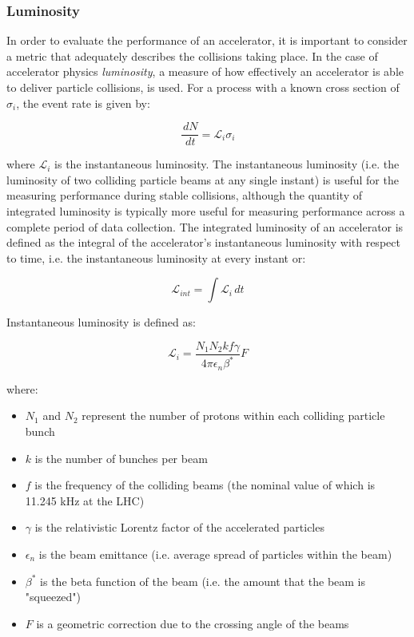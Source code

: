 \documentclass[12pt,a4paper,epsf,portrait,times,epsfig]{article}
\begin{document}

		\subsubsection{Luminosity}

		In order to evaluate the performance of an accelerator, it is important to consider a metric that adequately describes the collisions taking place. In the case of accelerator physics \textit{luminosity}, a measure of how effectively an accelerator is able to deliver particle collisions, is used. For a process with a known cross section of $\sigma_{i}$, the event rate is given by:
		
		\begin{equation}
			\frac{\,dN}{\,dt} = \mathcal{L}_{i}\sigma_{i}
		\end{equation}

		where $\mathcal{L}_{i}$ is the instantaneous luminosity. The instantaneous luminosity (i.e. the luminosity of two colliding particle beams at any single instant) is useful for the measuring performance during stable collisions, although the quantity of integrated luminosity is typically more useful for measuring performance across a complete period of data collection. The integrated luminosity of an accelerator is defined as the integral of the accelerator's instantaneous luminosity with respect to time, i.e. the instantaneous luminosity at every instant or:
		
		\begin{equation}
			\mathcal{L}_{int} = \int \mathcal{L}_{i} \,dt 			
		\end{equation}

		Instantaneous luminosity is defined as: 

		\begin{equation}
			\mathcal{L}_{i} = \frac{N_{1}N_{2}kf\gamma}{4\pi\epsilon_{n}\beta^{*}}F
		\end{equation}
		
		where:

		\begin{itemize}
			\item $N_{1}$ and $N_{2}$ represent the number of protons within each colliding particle bunch
			\item $k$ is the number of bunches per beam
			\item $f$ is the frequency of the colliding beams (the nominal value of which is 11.245 kHz at the LHC)
			\item $\gamma$ is the relativistic Lorentz factor of the accelerated particles
			\item $\epsilon_{n}$ is the beam emittance (i.e. average spread of particles within the beam)
			\item $\beta^{*}$ is the beta function of the beam (i.e. the amount that the beam is "squeezed")
			\item $F$ is a geometric correction due to the crossing angle of the beams
		\end{itemize}
\end{document}
